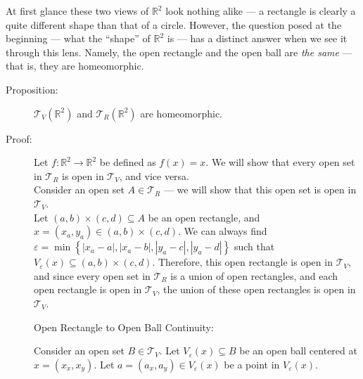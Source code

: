 \documentclass[12pt]{extarticle}
\newcommand{\R}{\mathbb{R}}
\begin{document}
  At first glance these two views of $\R^2$ look nothing alike --- a rectangle is clearly a quite different shape than that of a circle. However, the question posed at the beginning --- what the ``shape'' of $\R^2$ is --- has a distinct answer when we see it through this lens. Namely, the open rectangle and the open ball are \textit{the same} --- that is, they are homeomorphic.
  \begin{description}
    \item[Proposition:]$ \mathcal{T}_V(\R^2) $ and $ \mathcal{T}_R(\R^2) $ are homeomorphic.
    \item[Proof:] Let $f: \R^2 \rightarrow \R^2$ be defined as $f(x) = x$. We will show that every open set in $\mathcal{T}_R$ is open in $\mathcal{T}_V$, and vice versa.\\

      Consider an open set $A\in\mathcal{T}_R$ --- we will show that this open set is open in $\mathcal{T}_V$.\\

      Let $(a,b)\times(c,d)\subseteq A$ be an open rectangle, and $x = (x_a,y_a)\in (a,b)\times(c,d)$. We can always find $\varepsilon = \min\left\{|x_a-a|,|x_a-b|,|y_a-c|,|y_a-d|\right\}$ such that $V_{\varepsilon}(x) \subseteq (a,b)\times (c,d)$. Therefore, this open rectangle is open in $\mathcal{T}_V$, and since every open set in $\mathcal{T}_R$ is a union of open rectangles, and each open rectangle is open in $\mathcal{T}_V$, the union of these open rectangles is open in $\mathcal{T}_V$.
      \begin{center}
        Open Rectangle to Open Ball Continuity:\\
        \vspace{12pt}
      \end{center}
      Consider an open set $B\in\mathcal{T}_V$. Let $V_{\varepsilon}(x)\subseteq B$ be an open ball centered at $x = (x_x,x_y)$. Let $a=(a_x,a_y)\in V_{\varepsilon}(x)$ be a point in $V_{\varepsilon}(x)$.\\


\end{description}
\end{document}

